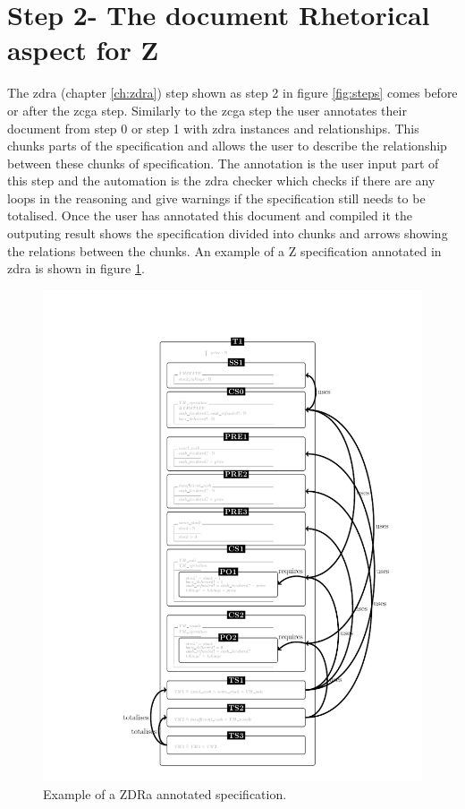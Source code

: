 \section{Step 2- The document Rhetorical aspect for Z}

The \gls{zdra} (chapter \ref{ch:zdra}) step shown as step 2 in figure \ref{fig:steps} comes before or after the \gls{zcga} step. Similarly to the \gls{zcga} step the user annotates their document from step 0 or step 1 with \gls{zdra} instances and relationships. This chunks parts of the specification and allows the user to describe the relationship between these chunks of specification. The annotation is the user input part of this step and the automation is the \gls{zdra} checker which checks if there are any loops in the reasoning and give warnings if the specification still needs to be totalised. Once the user has annotated this document and compiled it the outputing result shows the specification divided into chunks and arrows showing the relations between the chunks. An example of a Z specification annotated in \gls{zdra} is shown in figure \ref{fig:zdraexample}.

\begin{figure}[H]
 \begin{center}
 \includegraphics [scale=0.25]{Figures/Design/zdracomp.png}
 \caption{Example of a ZDRa annotated specification.}
 \label{fig:zdraexample}
\end{center}
\end{figure} 

